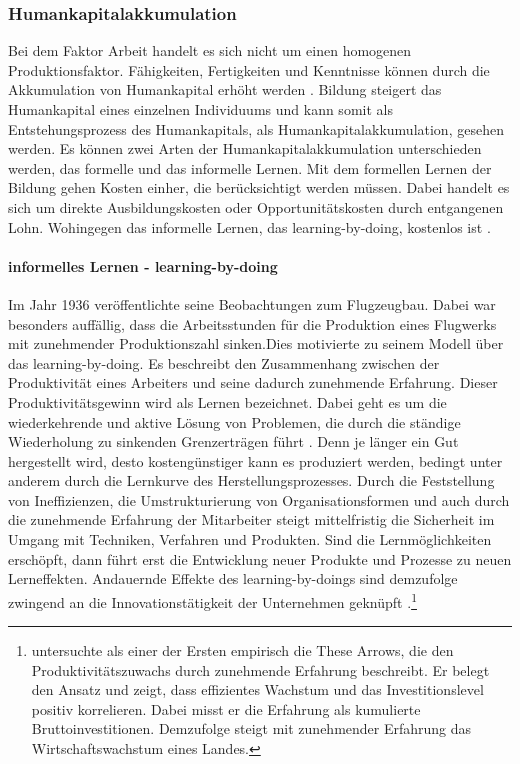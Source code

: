 \subsubsection{Humankapitalakkumulation}
Bei dem Faktor Arbeit handelt es sich nicht um einen homogenen Produktionsfaktor. F{\"a}higkeiten, Fertigkeiten und Kenntnisse k{\"o}nnen durch die Akkumulation von Humankapital erh{\"o}ht werden \citep{Ha.2002}.  Bildung steigert das Humankapital eines einzelnen Individuums und kann somit als Entstehungsprozess des Humankapitals, als Humankapitalakkumulation, gesehen werden. Es können zwei Arten der Humankapitalakkumulation unterschieden werden, das formelle und das informelle Lernen. Mit dem formellen Lernen der Bildung gehen Kosten einher, die berücksichtigt werden müssen. Dabei handelt es sich um direkte Ausbildungskosten oder Opportunit{\"a}tskosten durch entgangenen Lohn. Wohingegen das informelle Lernen, das learning-by-doing, kostenlos ist \citep{Arrow.1969}.

\paragraph{informelles Lernen - learning-by-doing}
Im Jahr 1936 ver{\"o}ffentlichte \citet{Wright.1936} seine Beobachtungen zum Flugzeugbau. Dabei war besonders auff{\"a}llig, dass die Arbeitsstunden f{\"u}r die Produktion eines Flugwerks mit zunehmender Produktionszahl sinken.\newline Dies motivierte \citet{Arrow.1962} zu seinem Modell {\"u}ber das learning-by-doing. Es beschreibt den Zusammenhang zwischen der Produktivit{\"a}t eines Arbeiters und seine dadurch zunehmende Erfahrung. Dieser Produktivitätsgewinn wird als Lernen bezeichnet. Dabei geht es um die wiederkehrende und aktive L{\"o}sung von Problemen, die durch die st{\"a}ndige Wiederholung zu sinkenden Grenzertr{\"a}gen f{\"u}hrt \citep{Arrow.1962,Sheshinski.1967}. Denn je l{\"a}nger ein Gut hergestellt wird, desto kosteng{\"u}nstiger kann es produziert werden, bedingt unter anderem durch die Lernkurve des Herstellungsprozesses. Durch die Feststellung von Ineffizienzen, die Umstrukturierung von Organisationsformen und auch durch die zunehmende Erfahrung der Mitarbeiter steigt mittelfristig die Sicherheit im Umgang mit Techniken, Verfahren und Produkten. Sind die Lernm{\"o}glichkeiten ersch{\"o}pft, dann f{\"u}hrt erst die Entwicklung neuer Produkte und Prozesse zu neuen Lerneffekten. Andauernde Effekte des learning-by-doings sind demzufolge zwingend an die Innovationst{\"a}tigkeit der Unternehmen gekn{\"u}pft \citep{Arrow.1962}.\footnote{\citet{Sheshinski.1967} untersuchte als einer der Ersten empirisch die These Arrows, die den Produktivit{\"a}tszuwachs durch zunehmende Erfahrung beschreibt. Er belegt den Ansatz und zeigt, dass effizientes Wachstum und das Investitionslevel positiv korrelieren. Dabei misst er die Erfahrung als kumulierte Bruttoinvestitionen. Demzufolge steigt mit zunehmender Erfahrung das Wirtschaftswachstum eines Landes.}


